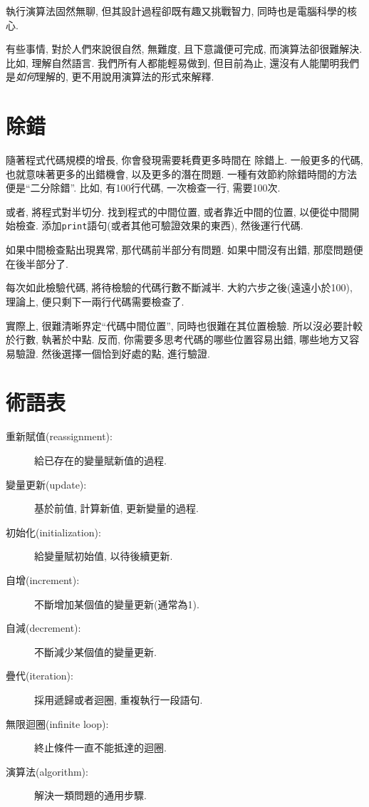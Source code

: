 \documentclass[10pt]{book}
\begin{document}
執行演算法固然無聊, 但其設計過程卻既有趣又挑戰智力, 
同時也是電腦科學的核心. 

有些事情, 對於人們來說很自然, 無難度, 且下意識便可完成, 
而演算法卻很難解決. 
比如, 理解自然語言. 我們所有人都能輕易做到, 
但目前為止, 還沒有人能闡明我們是{\em 如何}理解的, 
更不用說用演算法的形式來解釋. 

\section{除錯}
\label{bisectbug}
隨著程式代碼規模的增長, 你會發現需要耗費更多時間在
除錯上. 一般更多的代碼, 也就意味著更多的出錯機會, 
以及更多的潛在問題. 
一種有效節約除錯時間的方法便是``二分除錯''.
比如, 有100行代碼, 一次檢查一行, 需要100次. 

或者, 將程式對半切分. 找到程式的中間位置, 或者靠近中間的位置, 
以便從中間開始檢查. 添加{\tt print}語句(或者其他可驗證效果的東西), 
然後運行代碼. 

如果中間檢查點出現異常, 那代碼前半部分有問題. 
如果中間沒有出錯, 那麼問題便在後半部分了. 

每次如此檢驗代碼, 將待檢驗的代碼行數不斷減半. 大約六步之後(遠遠小於100), 
理論上, 便只剩下一兩行代碼需要檢查了. 

實際上, 很難清晰界定``代碼中間位置'', 同時也很難在其位置檢驗. 
所以沒必要計較於行數, 執著於中點. 
反而, 你需要多思考代碼的哪些位置容易出錯, 哪些地方又容易驗證. 
然後選擇一個恰到好處的點, 進行驗證. 



\section{術語表}

\begin{description}

\item[重新賦值(reassignment):] 給已存在的變量賦新值的過程. 

\item[變量更新(update):] 基於前值, 計算新值, 更新變量的過程. 

\item[初始化(initialization):] 給變量賦初始值, 以待後續更新. 

\item[自增(increment):] 不斷增加某個值的變量更新(通常為1). 

\item[自減(decrement):] 不斷減少某個值的變量更新. 

\item[疊代(iteration):] 採用遞歸或者迴圈, 重複執行一段語句. 

\item[無限迴圈(infinite loop):] 終止條件一直不能抵達的迴圈. 

\item[演算法(algorithm):]  解決一類問題的通用步驟. 

\end{description}
\end{document}
